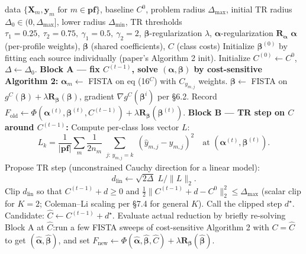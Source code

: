 \documentclass[11pt,a4paper]{article}
\begin{document}
\begin{algorithm}[H]
\caption{Cost-Sensitive iSFS via BCD with Trust-Region $C$-update}
\begin{algorithmic}[1]
\Require data $\{\mathbf{X}_m, \mathbf{y}_m \text{ for } m \in \mathbf{pf}\}$, baseline $C^0$, problem radius $\Delta_{\max}$, initial TR radius $\Delta_0 \in (0,\Delta_{\max}]$, lower radius $\Delta_{\min}$, TR thresholds $\tau_1=0.25,\ \tau_2=0.75,\ \gamma_1=0.5,\ \gamma_2=2$, $\boldsymbol{\beta}$-regularization $\lambda$, $\boldsymbol{\alpha}$-regularization $\mathbf{R}_{\boldsymbol{\alpha}}$
\Ensure $\boldsymbol{\alpha}$ (per-profile weights), $\boldsymbol{\beta}$ (shared coefficients), $C$ (class costs)
\State Initialize $\boldsymbol{\beta}^{(0)}$ by fitting each source individually (paper's Algorithm 2 init).
\State Initialize $C^{(0)} \gets C^0$, \;$\Delta \gets \Delta_0$.
    \State \textbf{Block A --- fix $C^{(t-1)}$, solve $(\boldsymbol{\alpha},\boldsymbol{\beta})$ by cost-sensitive Algorithm 2:}
    \Repeat
         \State $\boldsymbol{\alpha}_m \gets$ FISTA on eq (16$^C$) with $C_{y_{m,j}}$ weights. \EndFor
        \State $\boldsymbol{\beta} \gets$ FISTA on $g^C(\boldsymbol{\beta}) + \lambda \mathbf{R}_{\boldsymbol{\beta}}(\boldsymbol{\beta})$, gradient $\nabla g^C(\boldsymbol{\beta}^i)$ per \S 6.2.
    \State Record $F_{\text{old}} \gets \Phi(\boldsymbol{\alpha}^{(t)},\boldsymbol{\beta}^{(t)},C^{(t-1)}) + \lambda\mathbf{R}_{\boldsymbol{\beta}}(\boldsymbol{\beta}^{(t)})$.
    \State \textbf{Block B --- TR step on $C$ around $C^{(t-1)}$:}
    \State Compute per-class loss vector $L$:
    \[ L_k = \frac{1}{|\mathbf{pf}|}\sum_{m}\frac{1}{2 n_m}\!\!\sum_{\substack{j:\,y_{m,j}=k}}(\hat y_{m,j} - y_{m,j})^2\quad\text{at } (\boldsymbol{\alpha}^{(t)},\boldsymbol{\beta}^{(t)}). \]
    \State Propose TR step (unconstrained Cauchy direction for a linear model):
    \[ d_{\mathrm{lin}} \gets \sqrt{2\Delta}\;L/\|L\|_2. \]
    \State Clip $d_{\mathrm{lin}}$ so that $C^{(t-1)}+d \ge 0$ and $\tfrac12\|C^{(t-1)}+d-C^0\|_2^2 \le \Delta_{\max}$ (scalar clip for $K=2$; Coleman--Li scaling per \S 7.4 for general $K$). Call the clipped step $d^\star$.
    \State Candidate: $\widehat C \gets C^{(t-1)} + d^\star$.
    \State Evaluate actual reduction by briefly re-solving Block A at $\widehat C$:\;run a few FISTA sweeps of cost-sensitive Algorithm 2 with $C = \widehat C$ to get $(\widehat{\boldsymbol\alpha},\widehat{\boldsymbol\beta})$, and set $F_{\text{new}} \gets \Phi(\widehat{\boldsymbol\alpha},\widehat{\boldsymbol\beta},\widehat C) + \lambda\mathbf{R}_{\boldsymbol{\beta}}(\widehat{\boldsymbol\beta})$.

\end{algorithmic}
\end{algorithm}
\end{document}
